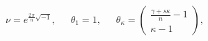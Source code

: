 \begin{equation}
\nu=e^{\frac{2\,\pi}{n}\sqrt{-1}},\,\,\,\,\,\,\,\,\,\theta_{1}=1,\,\,\,\,\,\,\,\,\,\theta_{\kappa}=\left(\begin{array}{c}
\frac{\gamma +s \kappa}{n}-1\\ \kappa -1
\end{array}\right),
\end{equation}

